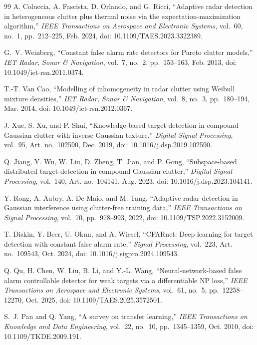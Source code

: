 \documentclass[journal]{IEEEtran}
\begin{document}
\begin{thebibliography}{99}
A. Coluccia, A. Fascista, D. Orlando, and G. Ricci, ``Adaptive radar detection in heterogeneous clutter plus thermal noise via the expectation-maximization algorithm,'' \emph{IEEE Transactions on Aerospace and Electronic Systems}, vol.~60, no.~1, pp.~212--225, Feb. 2024, doi: 10.1109/TAES.2023.3322389.

G.~V. Weinberg, ``Constant false alarm rate detectors for Pareto clutter models,'' \emph{IET Radar, Sonar \& Navigation}, vol.~7, no.~2, pp.~153--163, Feb. 2013, doi: 10.1049/iet-rsn.2011.0374.

T.-T. Van Cao, ``Modelling of inhomogeneity in radar clutter using Weibull mixture densities,'' \emph{IET Radar, Sonar \& Navigation}, vol.~8, no.~3, pp.~180--194, Mar. 2014, doi: 10.1049/iet-rsn.2012.0367.

J. Xue, S. Xu, and P. Shui, ``Knowledge-based target detection in compound Gaussian clutter with inverse Gaussian texture,'' \emph{Digital Signal Processing}, vol.~95, Art. no.~102590, Dec. 2019, doi: 10.1016/j.dsp.2019.102590.

Q. Jiang, Y. Wu, W. Liu, D. Zheng, T. Jian, and P. Gong, ``Subspace-based distributed target detection in compound-Gaussian clutter,'' \emph{Digital Signal Processing}, vol.~140, Art. no.~104141, Aug. 2023, doi: 10.1016/j.dsp.2023.104141.

Y. Rong, A. Aubry, A. De Maio, and M. Tang, ``Adaptive radar detection in Gaussian interference using clutter-free training data,'' \emph{IEEE Transactions on Signal Processing}, vol.~70, pp.~978--993, 2022, doi: 10.1109/TSP.2022.3152009.

T. Diskin, Y. Beer, U. Okun, and A. Wiesel, ``CFARnet: Deep learning for target detection with constant false alarm rate,'' \emph{Signal Processing}, vol.~223, Art. no.~109543, Oct. 2024, doi: 10.1016/j.sigpro.2024.109543.

Q. Qu, H. Chen, W. Liu, B. Li, and Y.-L. Wang, ``Neural-network-based false alarm controllable detector for weak targets via a differentiable NP loss,'' \emph{IEEE Transactions on Aerospace and Electronic Systems}, vol.~61, no.~5, pp.~12258--12270, Oct. 2025, doi: 10.1109/TAES.2025.3572501.

S.~J. Pan and Q. Yang, ``A survey on transfer learning,'' \emph{IEEE Transactions on Knowledge and Data Engineering}, vol.~22, no.~10, pp.~1345--1359, Oct. 2010, doi: 10.1109/TKDE.2009.191.


\end{thebibliography}
\end{document}
